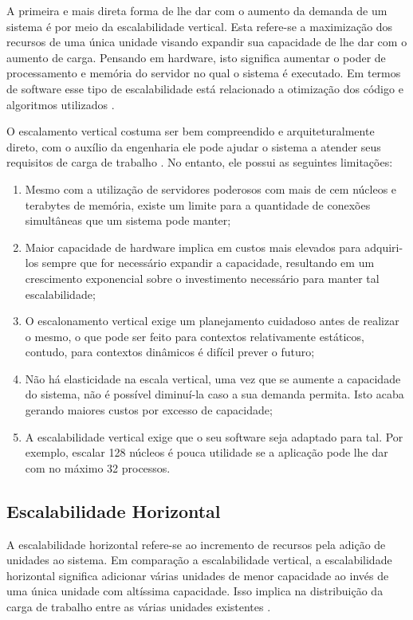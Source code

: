 A primeira e mais direta forma de lhe dar com o aumento da demanda de um
sistema é por meio da escalabilidade vertical. Esta refere-se a maximização
dos recursos de uma única unidade visando expandir sua capacidade de lhe dar
com o aumento de carga.  Pensando em hardware, isto significa aumentar o poder
de processamento e memória do servidor no qual o sistema é executado. Em termos
de software esse tipo de escalabilidade está relacionado a otimização dos código
e algoritmos utilizados \cite{FreshGuide2012}.

O escalamento vertical costuma ser bem compreendido e arquiteturalmente direto,
com o auxílio da engenharia ele pode ajudar o sistema a atender seus requisitos
de carga de trabalho \cite{InterSystems2019}. No entanto, ele possui as seguintes
limitações:

\begin{enumerate}
    \item{Mesmo com a utilização de servidores poderosos com mais de cem núcleos
    e terabytes de memória, existe um limite para a quantidade de conexões
    simultâneas que um sistema pode manter;}
    \item{Maior capacidade de hardware implica em custos mais elevados para
    adquiri-los sempre que for necessário expandir a capacidade, resultando em
    um crescimento exponencial sobre o investimento necessário para manter tal
    escalabilidade;}
    \item{O escalonamento vertical exige um planejamento cuidadoso antes de
    realizar o mesmo, o que pode ser feito para contextos relativamente estáticos,
    contudo, para contextos dinâmicos é difícil prever o futuro;}
    \item{Não há elasticidade na escala vertical, uma vez que se aumente a
    capacidade do sistema, não é possível diminuí-la caso a sua demanda permita.
    Isto acaba gerando maiores custos por excesso de capacidade;}
    \item{A escalabilidade vertical exige que o seu software seja adaptado para
    tal. Por exemplo, escalar 128 núcleos é pouca utilidade se a aplicação pode
    lhe dar com no máximo 32 processos.}
\end{enumerate}

\subsection{Escalabilidade Horizontal}

A escalabilidade horizontal refere-se ao incremento de recursos pela adição
de unidades ao sistema. Em comparação a escalabilidade vertical, a escalabilidade
horizontal significa adicionar várias unidades de menor capacidade ao invés de
uma única unidade com altíssima capacidade. Isso implica na distribuição da carga
de trabalho entre as várias unidades existentes \cite{FreshGuide2012}.

